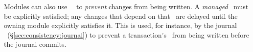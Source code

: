 Modules can also use \noop\ \chdescs\ to \emph{prevent} changes from being
 written.
%
A \emph{managed} \noop\ must be explicitly satisfied; any changes that
 depend on that \noop\ are delayed until the owning module explicitly
 satisfies it.
%
This is used, for instance, by the journal \module\
 (\S\ref{sec:consistency:journal}) to prevent a transaction's \chdescs\
 from being written before the journal commits.



